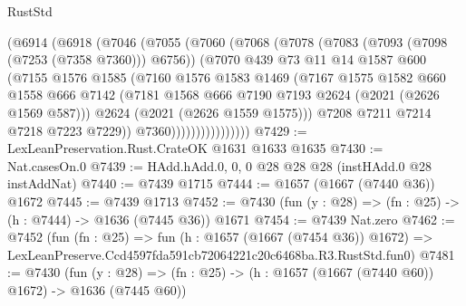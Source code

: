 \begin{lexlean}{RustStd}
\begin{coremodule}
                    (@6914
                      (@6918
                        (@7046
                          (@7055
                            (@7060
                              (@7068
                                (@7078
                                  (@7083 (@7093 (@7098 (@7253 (@7358 @7360))) @6756))
                                  (@7070
                                    @439
                                    @73
                                    @11
                                    @14
                                    @1587
                                    @600
                                    (@7155
                                      @1576
                                      @1585
                                      (@7160
                                        @1576
                                        @1583
                                        @1469
                                        (@7167
                                          @1575
                                          @1582
                                          @660
                                          @1558
                                          @666
                                          @7142
                                          (@7181
                                            @1568
                                            @666
                                            @7190
                                            @7193
                                            @2624
                                            (@2021 (@2626 @1569 @587)))
                                          @2624
                                          (@2021 (@2626 @1559 @1575)))
                                        @7208
                                        @7211
                                        @7214
                                        @7218
                                        @7223
                                        @7229))
                                    @7360))))))))))))))))
@7429 := LexLeanPreservation.Rust.CrateOK @1631 @1633 @1635
@7430 := Nat.casesOn.{0}
@7439 := HAdd.hAdd.{0, 0, 0} @28 @28 @28 (instHAdd.{0} @28 instAddNat)
@7440 := @7439 @1715
@7444 := @1657 (@1667 (@7440 @36)) @1672
@7445 := @7439 @1713
@7452 := @7430 (fun (y : @28) => (fn : @25) -> (h : @7444) -> @1636 (@7445 @36)) @1671
@7454 := @7439 Nat.zero
@7462 := @7452
    (fun (fn : @25) =>
    fun (h : @1657 (@1667 (@7454 @36)) @1672) =>
    LexLeanPreserve.Ccd4597fda591cb72064221c20c6468ba.R3.RustStd.fun0)
@7481 := @7430
    (fun (y : @28) => (fn : @25) -> (h : @1657 (@1667 (@7440 @60)) @1672) -> @1636 (@7445 @60))

\end{coremodule}
\end{lexlean}
